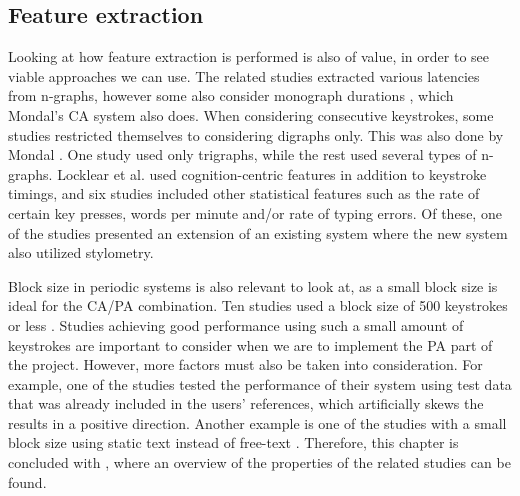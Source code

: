 \subsection{Feature extraction}
Looking at how feature extraction is performed is also of value, in order to see viable approaches we can use.
The related studies extracted various latencies from n-graphs, however some also consider monograph durations \cite{Pinto2014, superResults, KIM2017, Ahmed, Monrose, Janakiraman2007, monaco, BOURS201236, chi-square, Kolakowska2011, cognition, stewart, Tappert, pohmm}, which Mondal's \cite{mondal} CA system also does.
When considering consecutive keystrokes, some studies \cite{davoudi2009, davoudi2010, KIM2017, Ahmed, Janakiraman2007, Solami, BOURS201236, Monrose, park, monaco, chi-square, markov, Harun, occ, stewart, Tappert, meaningless, fast, pohmm} restricted themselves to considering digraphs only.
This was also done by Mondal \cite{mondal}.
One study \cite{900words} used only trigraphs, while the rest used several types of n-graphs.
Locklear et al. \cite{cognition} used cognition-centric features in addition to keystroke timings,
and six studies \cite{occ, Tappert, stewart, alsultan, monaco, pohmm} included other statistical features such as the rate of certain key presses, words per minute and/or rate of typing errors.
Of these, one of the studies \cite{stewart} presented an  extension of an existing system \cite{Tappert} where the new system also utilized stylometry.

Block size in periodic systems is also relevant to look at, as a small block size is ideal for the CA/PA combination.
Ten studies used a block size of 500 keystrokes or less \cite{superResults, Messerman, Pinto2014, Ahmed, hu, park, Janakiraman2007, chi-square, markov, Harun, fast}.
Studies achieving good performance using such a small amount of keystrokes are important to consider when we are to implement the PA part of the project.
However, more factors must also be taken into consideration. 
For example, one of the studies \cite{chi-square} tested the performance of their system using test data that was already included in the users' references, which artificially skews the results in a positive direction.
Another example is one of the studies with a small block size using static text instead of free-text \cite{hu}.
Therefore, this chapter is concluded with , where an overview of the properties of the related studies can be found.


